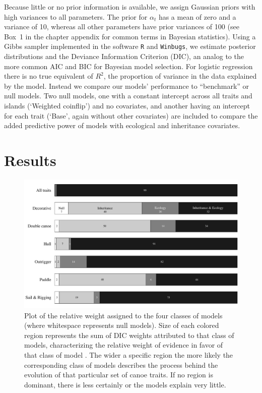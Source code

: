 Because little or no prior information is available, we assign Gaussian priors with high variances to all parameters. The prior for $\alpha_t$ has a mean of zero and a variance of 10, whereas all other parameters have prior variances of 100 (see Box~1 in the chapter appendix for common terms in Bayesian statistics). Using a Gibbs sampler implemented in the software \texttt{R} and \texttt{Winbugs}, we estimate posterior distributions and the Deviance Information Criterion (DIC), an analog to the more common AIC and BIC for Bayesian model selection\cite{Spiegelhalter2002, Gill2008}.  For logistic regression there is no true equivalent of $R^2$, the proportion of variance in the data explained by the model. Instead we compare our models' performance to ``benchmark'' or null models. Two null models, one with a constant intercept across all traits and islands (`Weighted coinflip') and no covariates, and another having an intercept for each trait (`Base', again without other covariates) are included to compare the added predictive power of models with ecological and inheritance covariates.


\section{Results}

    \begin{figure}[t]
    \begin{center}
      \includegraphics[scale=0.45]{figures/canoes/figBars.pdf}
    \end{center}
    \caption{Plot of the relative weight assigned to the four classes of models (where whitespace represents null models).  Size of each colored region represents the sum of DIC weights attributed to that class of models, characterizing the relative weight of evidence in favor of that class of model \citep{Burnham&Anderson:2002}. The wider a specific region the more likely the corresponding class of models describes the process behind the evolution of that particular set of canoe traits. If no region is dominant, there is less certainly or the models explain very little. }
    \label{barplot}
    \end{figure}
                         
